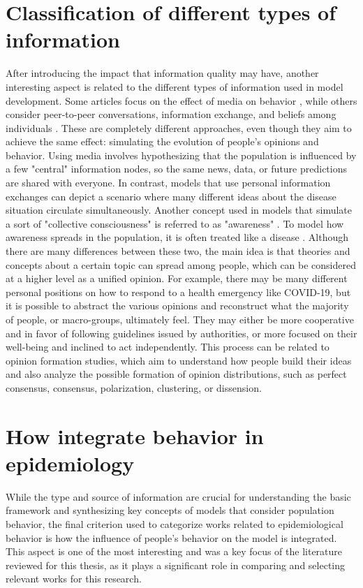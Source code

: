 \section{Classification of different types of information}
After introducing the impact that information quality may have, another interesting aspect is related to the different types of information used in model development. Some articles focus on the effect of media on behavior \cite{Collinson2014, Misra_2011}, while others consider peer-to-peer conversations, information exchange, and beliefs among individuals \cite{Tyson_2020}. These are completely different approaches, even though they aim to achieve the same effect: simulating the evolution of people's opinions and behavior. Using media involves hypothesizing that the population is influenced by a few "central" information nodes, so the same news, data, or future predictions are shared with everyone. In contrast, models that use personal information exchanges can depict a scenario where many different ideas about the disease situation circulate simultaneously.
Another concept used in models that simulate a sort of "collective consciousness" is referred to as "awareness" \cite{Funk2009}. To model how awareness spreads in the population, it is often treated like a disease \cite{Silva2019, Granell2013, Granell_2014, Kabir_2019, Zuo_2021, Wang_2019}. Although there are many differences between these two, the main idea is that theories and concepts about a certain topic can spread among people, which can be considered at a higher level as a unified opinion. For example, there may be many different personal positions on how to respond to a health emergency like COVID-19, but it is possible to abstract the various opinions and reconstruct what the majority of people, or macro-groups, ultimately feel. They may either be more cooperative and in favor of following guidelines issued by authorities, or more focused on their well-being and inclined to act independently.
This process can be related to opinion formation studies, which aim to understand how people build their ideas \cite{Devia_2023, Devia2022} and also analyze the possible formation of opinion distributions, such as perfect consensus, consensus, polarization, clustering, or dissension.

\section{How integrate behavior in epidemiology}
While the type and source of information are crucial for understanding the basic framework and synthesizing key concepts of models that consider population behavior, the final criterion used to categorize works related to epidemiological behavior is how the influence of people's behavior on the model is integrated. This aspect is one of the most interesting and was a key focus of the literature reviewed for this thesis, as it plays a significant role in comparing and selecting relevant works for this research.

